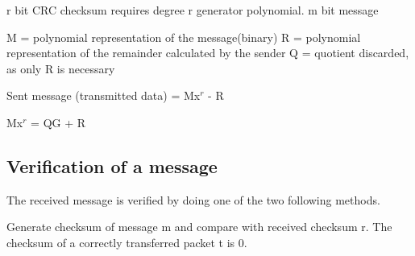 r bit CRC checksum requires degree r generator polynomial.
m bit message

M = polynomial representation of the message(binary)
R = polynomial representation of the remainder calculated by the sender
Q = quotient discarded, as only R is necessary

Sent message (transmitted data) = Mx$^r$ - R

Mx$^r$ = QG + R



\subsection{Verification of a message}
The received message is verified by doing one of the two following methods. 

Generate checksum of message m and compare with received checksum r.
The checksum of a correctly transferred packet t is 0.